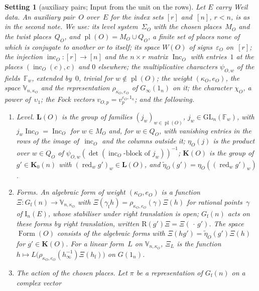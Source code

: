 \documentclass[11pt,a4paper]{article}
\newcommand{\m}[1]{\mbox{$#1$}}        %
\theoremstyle{plainx}
\theoremstyle{uprightx}
\newtheorem{setting}[theorem]{Setting}          %
\newcommand{\FF}{\mathbb{F}}
\newcommand{\Ginf}[1]{G_{\infty}(#1)}
\newcommand{\Gfin}[1]{G_{\mathrm{f}}(#1)}
\newcommand{\Gad}[1]{G(#1)}
\newcommand{\Kz}[1]{\mathbf{K}_{0}(#1)}
\newcommand{\std}[2]{\mathrm{I}_{#2}(#1)}
\newcommand{\one}[1]{1_{#1}}
\newcommand{\WO}[1]{W(#1)}
\newcommand{\sgO}[1]{\varepsilon_{#1}}
\newcommand{\incO}[1]{\operatorname{inc}_{#1}}
\newcommand{\IncM}[1]{\operatorname{Inc}_{#1}}
\newcommand{\kap}[1]{\kappa_{#1}}
\newcommand{\eO}[1]{e_{#1}}
\newcommand{\psiO}[2]{\psi_{#1,#2}}
\newcommand{\MO}[1]{M_{#1}}
\newcommand{\QO}[1]{Q_{#1}}
\newcommand{\plO}[1]{\operatorname{pl}(#1)}
\newcommand{\SigO}[1]{\Sigma_{#1}}
\newcommand{\chO}[1]{\chi_{#1}}
\newcommand{\LO}[1]{\mathbf{L}(#1)}
\newcommand{\KO}[1]{\mathbf{K}(#1)}
\newcommand{\etaO}[1]{\eta_{#1}}
\newcommand{\tetaO}[1]{\tilde{\eta}_{#1}}
\newcommand{\FormO}[1]{\operatorname{Form}(#1)}
\newcommand{\Vk}[2]{\mathbb{V}_{#1,#2}}
\newcommand{\rhoW}[2]{\rho_{#1,#2}}
\newcommand{\pvO}[2]{v_{#1,#2}}
\newcommand{\red}[1]{\operatorname{red}_{#1}}
\newcommand{\coef}[2]{#2_{#1}}
\begin{document}
\begin{setting}[auxiliary pairs; Input from the unit on the rows]\label{s:aux}
Let $E$ carry Weil data. An auxiliary pair~$O$ over~$E$ for the index sets $[r]$ and~$[n]$, \m{r<n}, is as in
the second note. We use: its level system~$\SigO{O}$ with the chosen places~$\MO{O}$ and the twist places~$\QO{O}$,
and \m{\plO{O}=\MO{O}\cup\QO{O}}, a finite set of places none of which is conjugate to another or to itself; its
space \m{\WO{O}} of signs~$\sgO{O}$ on~$[r]$; the injection \m{\incO{O}\colon[r]\to[n]} and the \m{n\times r}
matrix \m{\IncM{O}} with entries~$1$ at the places \m{(\incO{O}(c),c)} and $0$ elsewhere; the multiplicative
characters \m{\psiO{O}{w}} of the fields~$\FF_{w}$, extended by~$0$, trivial for \m{w\notin\plO{O}}; the weight
\m{(\kap{O},\eO{O})}, the space \m{\Vk{n}{\kap{O}}} and the representation \m{\rhoW{\kap{O}}{\eO{O}}} of \m{\Ginf{\one{n}}} on
it; the character \m{\chO{O}}, a power of~$\upsilon_{1}$; the Fock vectors \m{\pvO{O}{p}=v^{\sgO{O},\one{n}}_{p}}; and
the following.
\begin{enumerate}[label=\textup{(\alph*)},leftmargin=2.2em,itemsep=2pt,topsep=2pt]
\item \emph{Level.} \m{\LO{O}} is the group of families \m{(j_{w})_{w\in\plO{O}}}, \m{j_{w}\in\mathrm{GL}_{n}(\FF_{w})},
with \m{j_{w}\IncM{O}=\IncM{O}} for \m{w\in\MO{O}} and, for \m{w\in\QO{O}}, with vanishing entries in the rows of the
image of~$\incO{O}$ and the columns outside it; \m{\etaO{O}(j)} is the product over \m{w\in\QO{O}} of
\m{\psiO{O}{w}(\det(\incO{O}\text{-block of }j_{w}))^{-1}}; \m{\KO{O}} is the group of \m{g'\in\Kz{n}} with
\m{(\red{w}g')_{w}\in\LO{O}}, and \m{\tetaO{O}(g')=\etaO{O}((\red{w}g')_{w})}.
\item \emph{Forms.} An \emph{algebraic form of weight} \m{(\kap{O},\eO{O})} is a function
\m{\Xi\colon\Gfin{n}\to\Vk{n}{\kap{O}}} with \m{\Xi(\gamma_{\mathrm{f}}h)=\rhoW{\kap{O}}{\eO{O}}(\gamma)\Xi(h)} for rational
points~$\gamma$ of \m{\std{E}{n}}, whose stabiliser under right translation is open; \m{\Gfin{n}} acts on these
forms by right translation, written \m{\mathrm{R}(g')\Xi=\Xi(\,\cdot\,g')}. The space \m{\FormO{O}} consists of the
algebraic forms with \m{\Xi(hg')=\tetaO{O}(g')\Xi(h)} for \m{g'\in\KO{O}}. For a linear form~$L$ on \m{\Vk{n}{\kap{O}}},
\m{\coef{L}{\Xi}} is the function \m{h\mapsto L\bigl(\rhoW{\kap{O}}{\eO{O}}(h_{\infty}^{-1})\Xi(h_{\mathrm{f}})\bigr)} on
\m{\Gad{\one{n}}}.
\item \emph{The action of the chosen places.} Let $\pi$ be a representation of \m{\Gfin{n}} on a complex vector

\end{enumerate}
\end{setting}
\end{document}
